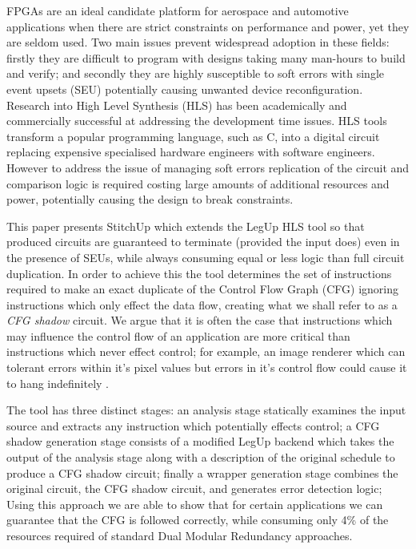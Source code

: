 FPGAs are an ideal candidate platform for aerospace and automotive applications
when there are strict constraints on performance and power, yet they are seldom used.
Two main issues prevent widespread adoption in these fields: firstly they are difficult
to program with designs taking many man-hours to build and verify;
and secondly they are highly susceptible to soft errors with single event upsets (SEU)
potentially causing unwanted device reconfiguration.
Research into High Level Synthesis (HLS) has been academically and commercially successful
at addressing the development time issues. HLS tools transform a popular programming language, such as C,
into a digital circuit replacing expensive specialised hardware engineers with software engineers.
However to address the issue of managing soft errors replication of the circuit and comparison logic is required
costing large amounts of additional resources and power, potentially causing the design to break constraints.

This paper presents StitchUp which extends the LegUp HLS tool \cite{canis2011legup} so that produced circuits are
guaranteed to terminate (provided the input does) even in the presence of SEUs, while always consuming equal or less logic than full circuit duplication.
In order to achieve this the tool determines the set of instructions required to make an exact duplicate of the Control
Flow Graph (CFG) ignoring instructions which only effect the data flow, creating what we shall refer to as a \emph{CFG shadow} circuit.
We argue that it is often the case that instructions which may influence the control flow of an application are more critical
than instructions which never effect control; for example, an image renderer which can tolerant errors within
it's pixel values but errors in it's control flow could cause it to hang indefinitely \cite{sampson2011enerj}.

The tool has three distinct stages: an analysis stage statically examines the input source and extracts any instruction
which potentially effects control; a CFG shadow generation stage consists of a modified LegUp backend
which takes the output of the analysis stage along with a description of the original schedule to produce a CFG shadow circuit;
finally a wrapper generation stage combines the original circuit, the CFG shadow circuit, and generates error detection logic;
Using this approach we are able to show that for certain applications we can guarantee that the CFG
is followed correctly, while consuming only 4\% of the resources required of standard Dual Modular Redundancy approaches.

